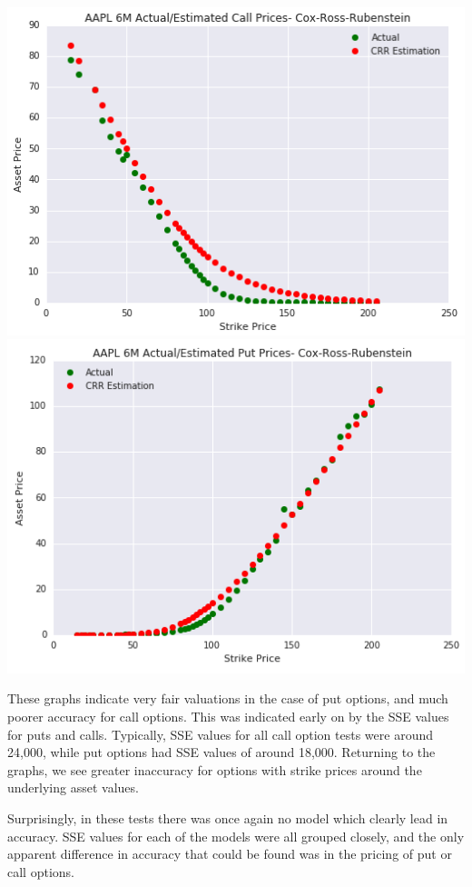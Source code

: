 \begin{center}
\includegraphics[scale=0.66, keepaspectratio=true]{Chapter3/AAPL6MCall.png}
\includegraphics[scale=0.66, keepaspectratio=true]{Chapter3/AAPL6MPut.png}
\end{center}

These graphs indicate very fair valuations in the case of put options, and much poorer accuracy for call options. This was indicated early on by the SSE values for puts and calls. Typically, SSE values for all call option tests were around 24,000, while put options had SSE values of around 18,000. Returning to the graphs, we see greater inaccuracy for options with strike prices around the underlying asset values. 

Surprisingly, in these tests there was once again no model which clearly lead in accuracy. SSE values for each of the models were all grouped closely, and the only apparent difference in accuracy that could be found was  in the pricing of put or call options.

